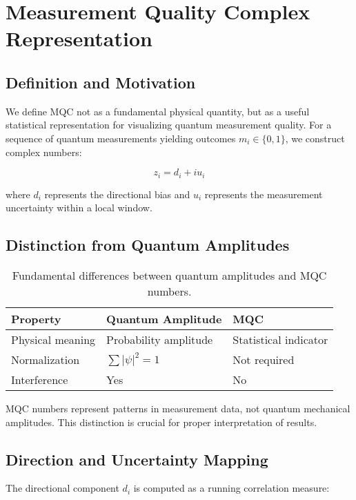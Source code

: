 \section{Measurement Quality Complex Representation}
\label{sec:theory}

\subsection{Definition and Motivation}

We define MQC not as a fundamental physical quantity, but as a useful statistical representation for visualizing quantum measurement quality. For a sequence of quantum measurements yielding outcomes $m_i \in \{0, 1\}$, we construct complex numbers:

\begin{equation}
z_i = d_i + i u_i
\label{eq:cqt_basic}
\end{equation}

where $d_i$ represents the directional bias and $u_i$ represents the measurement uncertainty within a local window.

\subsection{Distinction from Quantum Amplitudes}

\begin{table}[h]
\centering
\small
\begin{tabular}{lll}
\hline
Property & Quantum Amplitude & MQC \\
\hline
Physical meaning & Probability amplitude & Statistical indicator \\
Normalization & $\sum|\psi|^2 = 1$ & Not required \\
Interference & Yes & No \\
\hline
\end{tabular}
\caption{Fundamental differences between quantum amplitudes and MQC numbers.}
\end{table}

MQC numbers represent patterns in measurement data, not quantum mechanical amplitudes. This distinction is crucial for proper interpretation of results.

\subsection{Direction and Uncertainty Mapping}

The directional component $d_i$ is computed as a running correlation measure:

